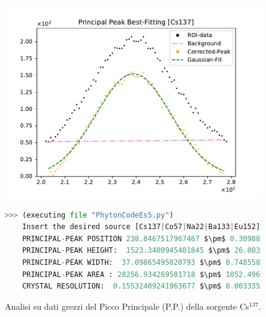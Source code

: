 \begin{figure}[h!]
	\centering
	\caption{Analisi su dati grezzi del Picco Principale (P.P.) della sorgente Cs$^{137}$. }
	\includegraphics[width =  \textwidth,trim={1cm 0 1cm 0}, clip]{Immagini/Peak-Fitting_Cs137_RAW.pdf}
	\label{fig:PPRawCs137} \bigskip\bigskip
	\begin{lstlisting}[language=python, style=Pystyle, mathescape=true]
	>>> (executing file "PhytonCodeEs5.py")
	Insert the desired source [Cs137|Co57|Na22|Ba133|Eu152]: Cs137
	PRINCIPAL-PEAK POSITION 238.8467517967467 $\pm$ 0.3098839895739907
	PRINCIPAL-PEAK HEIGHT:  1523.3400945401845 $\pm$ 26.00320803587605
	PRINCIPAL-PEAK WIDTH:  37.09865495020793 $\pm$ 0.7485587193418013
	PRINCIPAL-PEAK AREA : 28256.934269581718 $\pm$ 1052.4967764062292
	CRYSTAL RESOLUTION:  0.15532409241963677 $\pm$ 0.003335574642671817
	\end{lstlisting} \bigskip\bigskip
\end{figure}

\newpage

